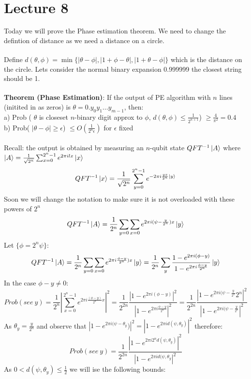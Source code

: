 \documentclass{article}
\begin{document}
\section{Lecture 8}
Today we will prove the Phase estimation theorem. We need to change the defintion of distance as we need a distance on a circle.\\\\
Define $d(\theta, \phi) = \min \{ |\theta -\phi|, |1 + \phi - \theta|, |1+ \theta - \phi|\}$ which is the distance on the circle. Lets consider the normal binary expansion 0.999999 the closest string should be 1.\\\\
\textbf{Theorem (Phase Estimation)}: If the output of PE algorithm with $n$ lines (initited in as zeros) is $\theta = 0.y_0y_1...y_{m-1}$, then:\\
a) Prob ( $\theta$ is closeset $n$-binary digit approx to $\phi$, $d(\theta, \phi) \leq \frac{1}{2^{n+1}}$) $\geq \frac{4}{\pi^2} = 0.4$\\
b) Prob( $|\theta - \phi| \geq \epsilon$) $\leq O(\frac{1}{2^n \epsilon})$ for $\epsilon$ fixed\\\\
Recall: the output is obtained by measuring an $n$-qubit state $QFT^{-1} \ket{A}$ where $\ket{A} = \frac{1}{\sqrt{2^n}} \sum_{x = 0}^{2^n-1} e^{2\pi i l x} \ket{x}$
$$
QFT^{-1} \ket{x} = \frac{1}{\sqrt{2^n}} \sum_{y= 0}^{2^n-1} e^{-2\pi i \frac{y x}{2^n} \ket{y}}
$$
Soon we will change the notation to make sure it is not overloaded with these powers of $2^n$
$$
QFT^{-1} \ket{A} = \frac{1}{2^n}\sum_{y=0} \sum_{x=0} e^{2 \pi i ( \psi - \frac{y}{2^n})x} \ket{y}
$$
Let $\{ \phi = 2^n \psi \}$:
$$
QFT^{-1} \ket{A} = \frac{1}{2^n}\sum_{y=0} \sum_{x=0} e^{2 \pi i  \frac{\phi - y}{2^n})x} \ket{y} = \frac{1}{2^n}  \sum_y \frac{ 1 - e^{2\pi i (\phi - y)}}{ 1 - e^{2\pi i \frac{\phi - y}{2^n}}} \ket{y}
$$
In the case $\phi - y \neq 0$:
$$
Prob( see\> y) =  \frac{1}{2^n} |\sum_{x=0}^{2^n-1} e^{2\pi i\frac{(\phi - y)}{2^n} x}|^2 = \frac{1}{2^{2n}} \frac{ |1 - e^{2\pi i (\phi - y)}|^2}{ | 1 - e^{2\pi i \frac{\phi - y}{2^n}}|^2} = \frac{1}{2^{2n}} \frac{| 1 - e^{2\pi i (\psi - \frac{y}{2^n}} 2^n|^2}{| 1 - e^{2\pi i (\psi - \frac{y}{2^n}}|^2}
$$
As $\theta_y = \frac{y}{2^n}$ and observe that $|1- e^{2\pi i(\psi - \theta_y})|^2 = |1 - e^{2\pi i d(\psi, \theta_y)}|^2$ therefore:
        $$
Prob( see\> y) =  \frac{1}{2^{2n}} \frac{|1 - e^{2\pi i 2^n d(\psi, \theta_y)}|^2}{|1 - e^{2 \pi i d(\psi, \theta_y}|^2}
        $$
As $0<d(\psi, \theta_y)\leq \frac{1}{2}$ we will ise the following bounds:\\
\end{document}
